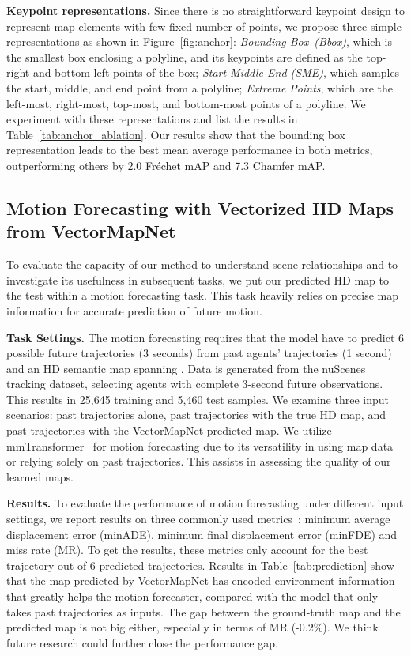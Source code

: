\documentclass{article}
\theoremstyle{plain}
\theoremstyle{definition}
\theoremstyle{remark}
\begin{document}
\noindent\textbf{Keypoint representations.}
\label{subsec:anchor}
Since there is no straightforward keypoint design to represent map elements with few fixed number of points, we propose three simple representations as shown in Figure~\ref{fig:anchor}: \textit{Bounding Box~(Bbox)}, which is the smallest box enclosing a polyline, and its keypoints are defined as the top-right and bottom-left points of the box; \textit{Start-Middle-End (SME)}, which samples the start, middle, and end point from a polyline; \textit{Extreme Points}, which are the left-most, right-most, top-most, and bottom-most points of a polyline. 
We experiment with these representations and list the results in Table~\ref{tab:anchor_ablation}.
Our results show that the bounding box representation leads to the best mean average performance in both metrics, outperforming others by 2.0 Fr\'echet mAP and 7.3 Chamfer mAP. 


\subsection{Motion Forecasting with Vectorized HD Maps from VectorMapNet}
To evaluate the capacity of our method to understand scene relationships and to investigate its usefulness in subsequent tasks, we put our predicted HD map to the test within a motion forecasting task. This task heavily relies on precise map information for accurate prediction of future motion.

\noindent\textbf{Task Settings.} The motion forecasting requires that the model have to predict 6 possible future trajectories (3 seconds) from past agents' trajectories (1 second) and an HD semantic map spanning . Data is generated from the nuScenes tracking dataset, selecting agents with complete 3-second future observations. This results in 25,645 training and 5,460 test samples. We examine three input scenarios: past trajectories alone, past trajectories with the true HD map, and past trajectories with the VectorMapNet predicted map. We utilize mmTransformer~\citep{liu2021multimodal} for motion forecasting due to its versatility in using map data or relying solely on past trajectories. This assists in assessing the quality of our learned maps.

\noindent\textbf{Results.} To evaluate the performance of motion forecasting under different input settings, we report results on three commonly used metrics~\citep{chang2019argoverse}: minimum average displacement error (minADE), minimum final displacement error (minFDE) and miss rate (MR). To get the results, these metrics only account for the best trajectory out of 6 predicted trajectories. Results in Table~\ref{tab:prediction} show that the map predicted by VectorMapNet has encoded environment information that greatly helps the motion forecaster, compared with the model that only takes past trajectories as inputs. The gap between the ground-truth map and the predicted map is not big either, especially in terms of MR (-0.2\%). We think future research could further close the performance gap.
\end{document}
